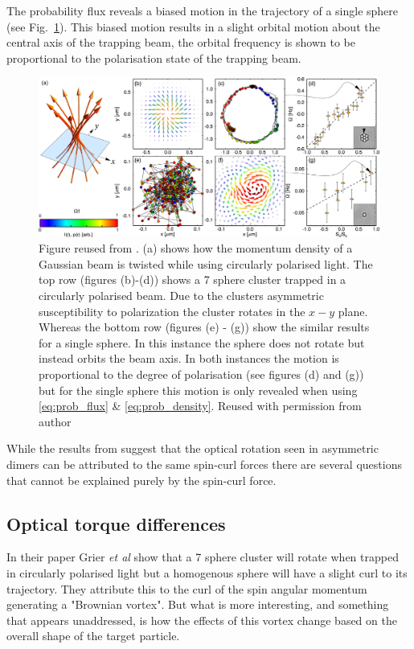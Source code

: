 The probability flux reveals a biased motion in the trajectory 
of a single sphere (see Fig.~\ref{fig:Ruffner_Grier}). This 
biased motion results in a slight orbital motion about the 
central axis of the trapping beam, the orbital frequency is 
shown to be proportional to the polarisation state of the 
trapping beam. 
\begin{figure}[h!]
	\centering
	\includegraphics[width=\linewidth]{Ruffner_Grier_2012.pdf}
	\caption{Figure reused from \cite{Ruffner2012}. (a) shows how 
		the momentum density of a Gaussian beam is twisted while 
		using circularly polarised light. The top row (figures 
		(b)-(d)) shows a 7 sphere cluster trapped in a circularly 
		polarised beam. Due to the clusters asymmetric susceptibility 
		to polarization the cluster rotates in the $x-y$ plane. 
		Whereas the bottom row (figures (e) - (g)) show the similar 
		results for a single sphere. In this instance the sphere 
		does not rotate but instead orbits the beam axis. In both 
		instances the motion is proportional to the degree of 
		polarisation (see figures (d) and (g)) but for the single 
		sphere this motion is only revealed when using 
		\eqref{eq:prob_flux} \& \eqref{eq:prob_density}. Reused 
		with permission from author}
	\label{fig:Ruffner_Grier}
\end{figure}

While the results from \cite{Ruffner2012} suggest that the 
optical rotation seen in asymmetric dimers can be attributed to 
the same spin-curl forces there are several questions that 
cannot be explained purely by the spin-curl force. 

\subsection{Optical torque differences}
In their paper Grier \textit{et al} show that a 7 sphere cluster
will rotate when trapped in circularly polarised light but a 
homogenous sphere will have a slight curl to its trajectory. 
They attribute this to the curl of the spin angular momentum
generating a "Brownian vortex". But what is more interesting, 
and something that appears unaddressed, is how the effects of 
this vortex change based on the overall shape of the target
particle.

